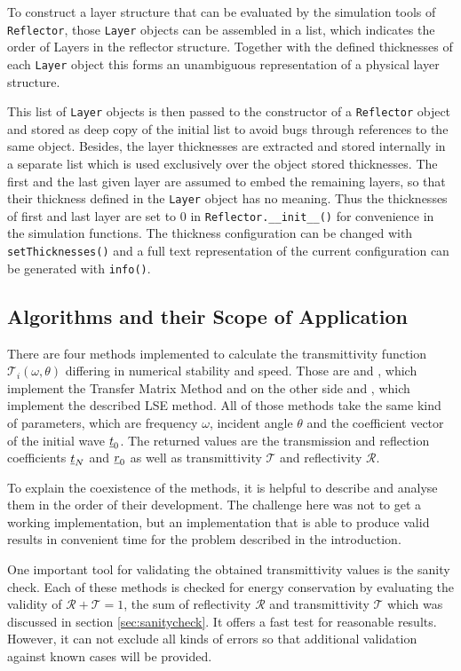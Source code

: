 To construct a layer structure that can be evaluated by the simulation tools of
\texttt{Reflector}, those \texttt{Layer} objects can be assembled in a list,
which indicates the order of Layers in the reflector structure. Together with
the defined thicknesses of each \texttt{Layer} object this forms an unambiguous
representation of a physical layer structure.

This list of \texttt{Layer} objects is then passed to the constructor of a
\texttt{Reflector} object and stored as deep copy of the initial list to avoid
bugs through references to the same object. Besides, the layer thicknesses are
extracted and stored internally in a separate list which is used exclusively
over the object stored thicknesses. The first and the last given
layer are assumed to embed the remaining layers, so that their thickness
defined in the \texttt{Layer} object has no meaning. Thus the thicknesses of
first and last layer are set to $0$ in \texttt{Reflector.\_\_init\_\_()} for
convenience in the simulation functions. The thickness configuration can be
changed with \texttt{setThicknesses()} and a full text representation of the
current configuration can be generated with \texttt{info()}.

\subsection{Algorithms and their Scope of Application }
There are four methods implemented to calculate the transmittivity function
$\mathcal{T}_i(\omega, \theta)$ differing in numerical stability and speed.
Those are  and , which implement
the Transfer Matrix Method and on the other side  and
, which implement the described LSE method. All of those
methods take the same kind of parameters, which are frequency $\omega$,
incident angle $\theta$ and the coefficient vector of the initial wave
$\underline{t}_0$. The returned values are the transmission and reflection
coefficients $\underline{t}_N$ and $\underline{r}_0$ as well as transmittivity
$\mathcal{T}$ and reflectivity $\mathcal{R}$.

To explain the coexistence of the methods, it is helpful to describe and
analyse them in the order of their development. The challenge here was not to
get a working implementation, but an implementation that is able to produce
valid results in convenient time for the problem described in the introduction.

One important tool for validating the obtained transmittivity values is the
sanity check. Each of these methods is checked for energy conservation by
evaluating the
validity of $\mathcal{R}+\mathcal{T}=1$, the sum of reflectivity $\mathcal{R}$
and transmittivity $\mathcal{T}$ which was discussed in section
\ref{sec:sanitycheck}. It offers a fast test for reasonable
results. However, it can not exclude all kinds of errors so that additional
validation against known cases will be provided.

